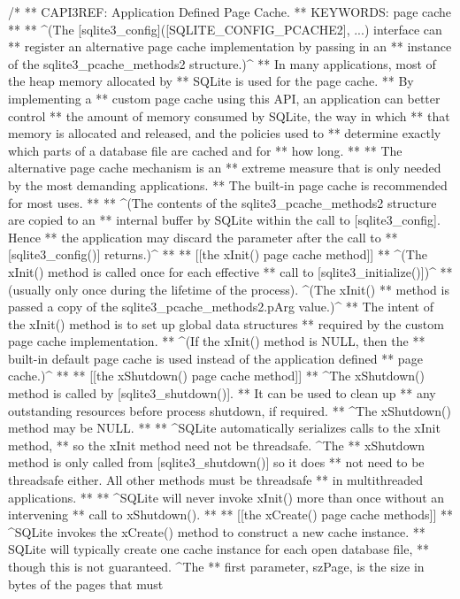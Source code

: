 \begin{Codex}[label=sqlite3.h,numbers=left]
{/*
** CAPI3REF: Application Defined Page Cache.
** KEYWORDS: {page cache}
**
** ^(The [sqlite3_config]([SQLITE_CONFIG_PCACHE2], ...) interface can
** register an alternative page cache implementation by passing in an 
** instance of the sqlite3_pcache_methods2 structure.)^
** In many applications, most of the heap memory allocated by 
** SQLite is used for the page cache.
** By implementing a 
** custom page cache using this API, an application can better control
** the amount of memory consumed by SQLite, the way in which 
** that memory is allocated and released, and the policies used to 
** determine exactly which parts of a database file are cached and for 
** how long.
**
** The alternative page cache mechanism is an
** extreme measure that is only needed by the most demanding applications.
** The built-in page cache is recommended for most uses.
**
** ^(The contents of the sqlite3_pcache_methods2 structure are copied to an
** internal buffer by SQLite within the call to [sqlite3_config].  Hence
** the application may discard the parameter after the call to
** [sqlite3_config()] returns.)^
**
** [[the xInit() page cache method]]
** ^(The xInit() method is called once for each effective 
** call to [sqlite3_initialize()])^
** (usually only once during the lifetime of the process). ^(The xInit()
** method is passed a copy of the sqlite3_pcache_methods2.pArg value.)^
** The intent of the xInit() method is to set up global data structures 
** required by the custom page cache implementation. 
** ^(If the xInit() method is NULL, then the 
** built-in default page cache is used instead of the application defined
** page cache.)^
**
** [[the xShutdown() page cache method]]
** ^The xShutdown() method is called by [sqlite3_shutdown()].
** It can be used to clean up 
** any outstanding resources before process shutdown, if required.
** ^The xShutdown() method may be NULL.
**
** ^SQLite automatically serializes calls to the xInit method,
** so the xInit method need not be threadsafe.  ^The
** xShutdown method is only called from [sqlite3_shutdown()] so it does
** not need to be threadsafe either.  All other methods must be threadsafe
** in multithreaded applications.
**
** ^SQLite will never invoke xInit() more than once without an intervening
** call to xShutdown().
**
** [[the xCreate() page cache methods]]
** ^SQLite invokes the xCreate() method to construct a new cache instance.
** SQLite will typically create one cache instance for each open database file,
** though this is not guaranteed. ^The
** first parameter, szPage, is the size in bytes of the pages that must
}
\end{Codex}
